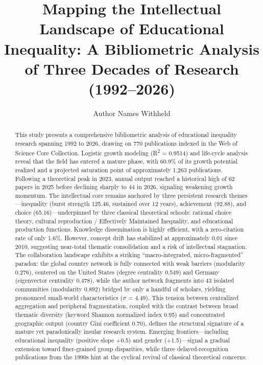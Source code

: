 \documentclass[12pt,a4paper]{article}
\title{Mapping the Intellectual Landscape of Educational Inequality: A Bibliometric Analysis of Three Decades of Research (1992–2026)}
\author{Author Names Withheld}
\date{}
\begin{document}
\maketitle

\begin{abstract}
This study presents a comprehensive bibliometric analysis of educational inequality research spanning 1992 to 2026, drawing on 770 publications indexed in the Web of Science Core Collection. Logistic growth modeling (R\textsuperscript{2} = 0.9514) and life-cycle analysis reveal that the field has entered a mature phase, with 60.9\% of its growth potential realized and a projected saturation point of approximately 1,263 publications. Following a theoretical peak in 2023, annual output reached a historical high of 62 papers in 2025 before declining sharply to 44 in 2026, signaling weakening growth momentum. The intellectual core remains anchored by three persistent research themes—inequality (burst strength 125.46, sustained over 12 years), achievement (92.88), and choice (65.16)—underpinned by three classical theoretical schools: rational choice theory, cultural reproduction / Effectively Maintained Inequality, and educational production functions. Knowledge dissemination is highly efficient, with a zero-citation rate of only 1.6\%. However, concept drift has stabilized at approximately 0.01 since 2010, suggesting near-total thematic consolidation and a risk of intellectual stagnation. The collaboration landscape exhibits a striking ``macro-integrated, micro-fragmented'' paradox: the global country network is fully connected with weak barriers (modularity 0.276), centered on the United States (degree centrality 0.549) and Germany (eigenvector centrality 0.478), while the author network fragments into 43 isolated communities (modularity 0.892) bridged by only a handful of scholars, yielding pronounced small-world characteristics ($\sigma$ = 4.49). This tension between centralized aggregation and peripheral fragmentation, coupled with the contrast between broad thematic diversity (keyword Shannon normalized index 0.95) and concentrated geographic output (country Gini coefficient 0.70), defines the structural signature of a mature yet paradoxically insular research system. Emerging frontiers—including educational inequality (positive slope +0.5) and gender (+1.5)—signal a gradual extension toward finer-grained group disparities, while three delayed-recognition publications from the 1990s hint at the cyclical revival of classical theoretical concerns.
\end{abstract}
\end{document}
